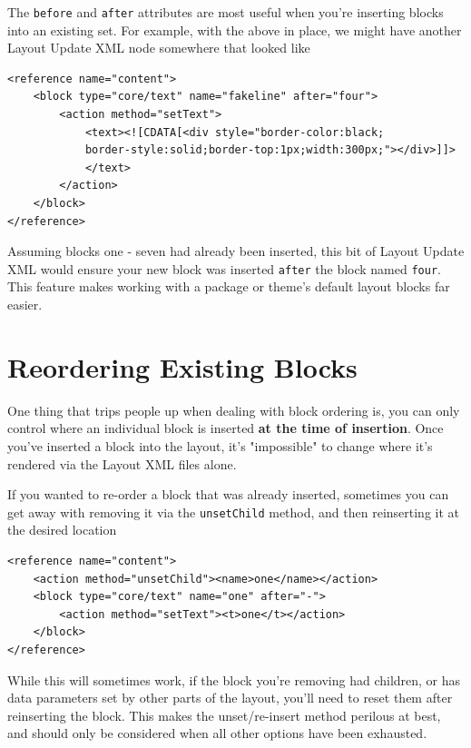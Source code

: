 \documentclass[oneside]{book}
\begin{document}
The \footnotesize\texttt{before} \normalsize  and \footnotesize\texttt{after} \normalsize  attributes are most useful when you're inserting blocks into an existing set.  For example, with the above in place, we might have another Layout Update XML node somewhere that looked like

\begin{lstlisting}
<reference name="content">
    <block type="core/text" name="fakeline" after="four">
        <action method="setText">
            <text><![CDATA[<div style="border-color:black;
            border-style:solid;border-top:1px;width:300px;"></div>]]>
            </text>
        </action>
    </block>
</reference>

\end{lstlisting}


Assuming blocks one - seven had already been inserted, this bit of Layout Update XML would ensure your new block was inserted \footnotesize\texttt{after} \normalsize  the block named \footnotesize\texttt{four}\normalsize.  This feature makes working with a package or theme's default layout blocks far easier.

\section{Reordering Existing Blocks}

One thing that trips people up when dealing with block ordering is, you can only control where an individual block is inserted \textbf{at the time of insertion}.  Once you've inserted a block into the layout, it's "impossible" to change where it's rendered via the Layout XML files alone.

If you wanted to re-order a block that was already inserted, sometimes you can get away with removing it via the \footnotesize\texttt{unsetChild} \normalsize  method, and then reinserting it at the desired location

\begin{lstlisting}
<reference name="content">
    <action method="unsetChild"><name>one</name></action>
    <block type="core/text" name="one" after="-">
        <action method="setText"><t>one</t></action>
    </block>
</reference>

\end{lstlisting}


While this will sometimes work, if the block you're removing had children, or has data parameters set by other parts of the layout, you'll need to reset them after reinserting the block.  This makes the unset/re-insert method perilous at best, and should only be considered when all other options have been exhausted.
\end{document}
